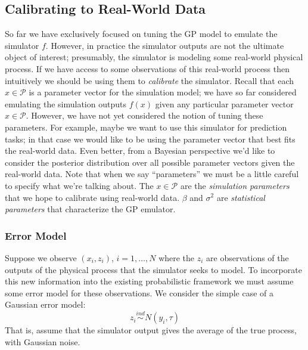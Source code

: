 \documentclass[12pt]{article}
\begin{document}
\subsection{Calibrating to Real-World Data}
So far we have exclusively focused on tuning the GP model to emulate the simulator $f$. However, in practice the simulator outputs are not the ultimate object of interest; presumably, 
the simulator is modeling some real-world physical process. If we have access to some observations of this real-world process then intuitively we should be using them to \textit{calibrate}
the simulator. Recall that each $x \in \mathcal{P}$ is a parameter vector for the simulation model; we have so far considered emulating the simulation outputs $f(x)$ given any particular 
parameter vector $x \in \mathcal{P}$. However, we have not yet considered the notion of tuning these parameters. For example, maybe we want to use this simulator for prediction tasks; 
in that case we would like to be using the parameter vector that best fits the real-world data. Even better, from a Bayesian perspective we'd like to consider the posterior distribution over all 
possible parameter vectors given the real-world data. Note that when we say ``parameters'' we must be a little careful to specify what we're talking about. The $x \in \mathcal{P}$ are the 
\textit{simulation parameters} that we hope to calibrate using real-world data. $\beta$ and $\sigma^2$ are \textit{statistical parameters} that characterize the GP emulator. 

\subsubsection{Error Model}
Suppose we observe $(x_i, z_i)$, $i = 1, \dots, N$ where the $z_i$ are observations of the outputs of the physical process that the simulator seeks to model. To incorporate this new information
into the existing probabilistic framework we must assume some error model for these observations. We consider the simple case of a Gaussian error model: 
\[z_i \overset{ind}{\sim} N(y_i, \tau)\]
That is, assume that the simulator output gives the average of the true process, with Gaussian noise. 
\end{document}
